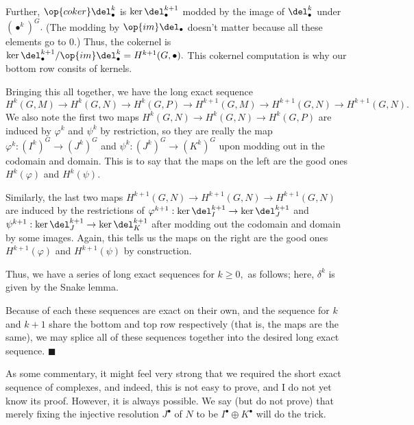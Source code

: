 Further, $\op{coker}\del_\bullet^k$ is $\ker\del_\bullet^{k+1}$ modded by the image of $\del_\bullet^k$ under $(\bullet^k)^G.$ (The modding by $\op{im}\del_\bullet$ doesn't matter because all these elements go to $0.$) Thus, the cokernel is $\ker\del_\bullet^{k+1}/\op{im}\del_\bullet^k=H^{k+1}(G,\bullet).$ This cokernel computation is why our bottom row consits of kernels.

Bringing this all together, we have the long exact sequence
\[H^k(G,M)\to H^k(G,N)\to H^k(G,P)\to H^{k+1}(G,M)\to H^{k+1}(G,N)\to H^{k+1}(G,N).\]
We also note the first two maps $H^k(G,N)\to H^k(G,N)\to H^k(G,P)$ are induced by $\varphi^k$ and $\psi^k$ by restriction, so they are really the map $\varphi^k:(I^k)^G\to(J^k)^G$ and $\psi^k:(J^k)^G\to (K^k)^G$ upon modding out in the codomain and domain. This is to say that the maps on the left are the good ones $H^k(\varphi)$ and $H^k(\psi).$

Similarly, the last two maps $H^{k+1}(G,N)\to H^{k+1}(G,N)\to H^{k+1}(G,N)$ are induced by the restrictions of $\varphi^{k+1}:\ker\del_I^{k+1}\to\ker\del_J^{k+1}$ and $\psi^{k+1}:\ker\del_J^{k+1}\to\ker\del_K^{k+1}$ after modding out the codomain and domain by some images. Again, this tells us the maps on the right are the good ones $H^{k+1}(\varphi)$ and $H^{k+1}(\psi)$ by construction.

Thus, we have a series of long exact sequences for $k\ge0,$ as follows; here, $\delta^k$ is given by the Snake lemma.
\begin{center}
\end{center}
Because of each these sequences are exact on their own, and the sequence for $k$ and $k+1$ share the bottom and top row respectively (that is, the maps are the same), we may splice all of these sequences together into the desired long exact sequence. $\blacksquare$

As some commentary, it might feel very strong that we required the short exact sequence of complexes, and indeed, this is not easy to prove, and I do not yet know its proof. However, it is always possible. We say (but do not prove) that merely fixing the injective resolution $J^\bullet$ of $N$ to be $I^\bullet\oplus K^\bullet$ will do the trick.


